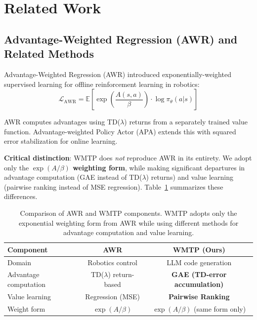 \section{Related Work}

\subsection{Advantage-Weighted Regression (AWR) and Related Methods}

Advantage-Weighted Regression (AWR) \citep{peng2019advantage} introduced exponentially-weighted supervised learning for offline reinforcement learning in robotics:
\begin{equation}
    \mathcal{L}_{\text{AWR}} = \mathbb{E}\left[ \exp\left(\frac{A(s,a)}{\beta}\right) \cdot \log \pi_\theta(a|s) \right]
\end{equation}

AWR computes advantages using TD($\lambda$) returns from a separately trained value function. Advantage-weighted Policy Actor (APA) extends this with squared error stabilization for online learning.

\textbf{Critical distinction}: WMTP does \textit{not} reproduce AWR in its entirety. We adopt only the \textbf{$\exp(A/\beta)$ weighting form}, while making significant departures in advantage computation (GAE instead of TD($\lambda$) returns) and value learning (pairwise ranking instead of MSE regression). Table~\ref{tab:awr_comparison} summarizes these differences.

\begin{table}[h]
\centering
\caption{Comparison of AWR and WMTP components. WMTP adopts only the exponential weighting form from AWR while using different methods for advantage computation and value learning.}
\label{tab:awr_comparison}
\begin{tabular}{lcc}
\toprule
\textbf{Component} & \textbf{AWR} \citep{peng2019advantage} & \textbf{WMTP (Ours)} \\
\midrule
Domain & Robotics control & LLM code generation \\
Advantage computation & TD($\lambda$) return-based & \textbf{GAE (TD-error accumulation)} \\
Value learning & Regression (MSE) & \textbf{Pairwise Ranking} \\
Weight form & $\exp(A/\beta)$ & $\exp(A/\beta)$ (same form only) \\
\bottomrule
\end{tabular}
\end{table}

